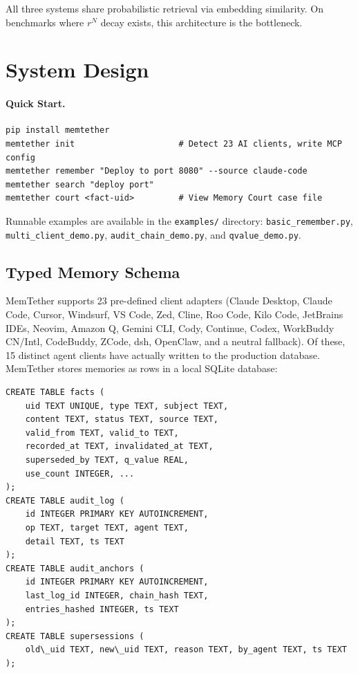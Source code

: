 \documentclass{article}
\begin{document}
All three systems share probabilistic retrieval via embedding similarity. On benchmarks where $r^N$ decay exists, this architecture is the bottleneck.
\label{sec:crosssys}
\section{System Design}
\label{sec:design}


\paragraph{Quick Start.}
\begin{verbatim}
pip install memtether
memtether init                     # Detect 23 AI clients, write MCP config
memtether remember "Deploy to port 8080" --source claude-code
memtether search "deploy port"
memtether court <fact-uid>         # View Memory Court case file
\end{verbatim}
Runnable examples are available in the \texttt{examples/} directory: \texttt{basic\_remember.py}, \texttt{multi\_client\_demo.py}, \texttt{audit\_chain\_demo.py}, and \texttt{qvalue\_demo.py}.

\subsection{Typed Memory Schema}
MemTether supports 23 pre-defined client adapters (Claude Desktop, Claude Code, Cursor, Windsurf, VS Code, Zed, Cline, Roo Code, Kilo Code, JetBrains IDEs, Neovim, Amazon Q, Gemini CLI, Cody, Continue, Codex, WorkBuddy CN/Intl, CodeBuddy, ZCode, dsh, OpenClaw, and a neutral fallback). Of these, 15 distinct agent clients have actually written to the production database. MemTether stores memories as rows in a local SQLite database:

\begin{verbatim}
CREATE TABLE facts (
    uid TEXT UNIQUE, type TEXT, subject TEXT,
    content TEXT, status TEXT, source TEXT,
    valid_from TEXT, valid_to TEXT,
    recorded_at TEXT, invalidated_at TEXT,
    superseded_by TEXT, q_value REAL,
    use_count INTEGER, ...
);
CREATE TABLE audit_log (
    id INTEGER PRIMARY KEY AUTOINCREMENT,
    op TEXT, target TEXT, agent TEXT,
    detail TEXT, ts TEXT
);
CREATE TABLE audit_anchors (
    id INTEGER PRIMARY KEY AUTOINCREMENT,
    last_log_id INTEGER, chain_hash TEXT,
    entries_hashed INTEGER, ts TEXT
);
CREATE TABLE supersessions (
    old\_uid TEXT, new\_uid TEXT, reason TEXT, by_agent TEXT, ts TEXT
);
\end{verbatim}
\end{document}

